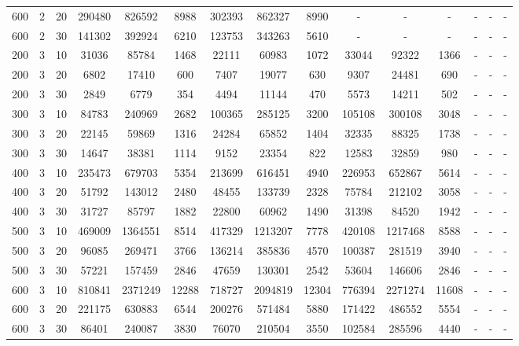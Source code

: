 \documentclass{article}
\begin{document}
\begin{table}[H]
\begin{center}
\begin{tabular}{| c | c | c | c | c | c | c | c | c | c | c | c | c | c | c |}
                    600 & 2 & 20 & 290480 & 826592 & 8988 & 302393 & 862327 & 8990 & - & - & - & - & - & - \\
                    600 & 2 & 30 & 141302 & 392924 & 6210 & 123753 & 343263 & 5610 & - & - & - & - & - & - \\
                    200 & 3 & 10 & 31036 & 85784 & 1468 & 22111 & 60983 & 1072 & 33044 & 92322 & 1366 & - & - & - \\
                    200 & 3 & 20 & 6802 & 17410 & 600 & 7407 & 19077 & 630 & 9307 & 24481 & 690 & - & - & - \\
                    200 & 3 & 30 & 2849 & 6779 & 354 & 4494 & 11144 & 470 & 5573 & 14211 & 502 & - & - & - \\
                    300 & 3 & 10 & 84783 & 240969 & 2682 & 100365 & 285125 & 3200 & 105108 & 300108 & 3048 & - & - & - \\
                    300 & 3 & 20 & 22145 & 59869 & 1316 & 24284 & 65852 & 1404 & 32335 & 88325 & 1738 & - & - & - \\
                    300 & 3 & 30 & 14647 & 38381 & 1114 & 9152 & 23354 & 822 & 12583 & 32859 & 980 & - & - & - \\
                    400 & 3 & 10 & 235473 & 679703 & 5354 & 213699 & 616451 & 4940 & 226953 & 652867 & 5614 & - & - & - \\
                    400 & 3 & 20 & 51792 & 143012 & 2480 & 48455 & 133739 & 2328 & 75784 & 212102 & 3058 & - & - & - \\
                    400 & 3 & 30 & 31727 & 85797 & 1882 & 22800 & 60962 & 1490 & 31398 & 84520 & 1942 & - & - & - \\
                    500 & 3 & 10 & 469009 & 1364551 & 8514 & 417329 & 1213207 & 7778 & 420108 & 1217468 & 8588 & - & - & - \\
                    500 & 3 & 20 & 96085 & 269471 & 3766 & 136214 & 385836 & 4570 & 100387 & 281519 & 3940 & - & - & - \\
                    500 & 3 & 30 & 57221 & 157459 & 2846 & 47659 & 130301 & 2542 & 53604 & 146606 & 2846 & - & - & - \\
                    600 & 3 & 10 & 810841 & 2371249 & 12288 & 718727 & 2094819 & 12304 & 776394 & 2271274 & 11608 & - & - & - \\
                    600 & 3 & 20 & 221175 & 630883 & 6544 & 200276 & 571484 & 5880 & 171422 & 486552 & 5554 & - & - & - \\
                    600 & 3 & 30 & 86401 & 240087 & 3830 & 76070 & 210504 & 3550 & 102584 & 285596 & 4440 & - & - & - \\

\end{tabular}
\end{center}
\end{table}
\end{document}
